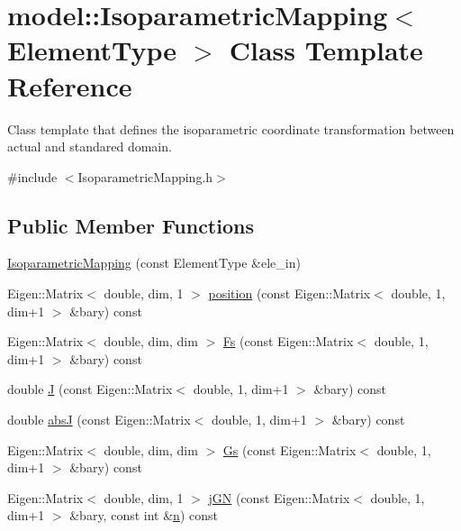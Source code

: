 \hypertarget{classmodel_1_1_isoparametric_mapping}{}\section{model\+:\+:Isoparametric\+Mapping$<$ Element\+Type $>$ Class Template Reference}
\label{classmodel_1_1_isoparametric_mapping}


Class template that defines the isoparametric coordinate transformation between actual and standared domain.  




{\ttfamily \#include $<$Isoparametric\+Mapping.\+h$>$}

\subsection*{Public Member Functions}
\begin{DoxyCompactItemize}
\item 
\hyperlink{classmodel_1_1_isoparametric_mapping_aa00eda6fb2ac62feab0304d6db3b9f85}{Isoparametric\+Mapping} (const Element\+Type \&ele\+\_\+in)
\item 
Eigen\+::\+Matrix$<$ double, dim, 1 $>$ \hyperlink{classmodel_1_1_isoparametric_mapping_afc694265c0b3e3e5ea515546f6ba3deb}{position} (const Eigen\+::\+Matrix$<$ double, 1, dim+1 $>$ \&bary) const 
\item 
Eigen\+::\+Matrix$<$ double, dim, dim $>$ \hyperlink{classmodel_1_1_isoparametric_mapping_a90cd80e33df4e67e2c7e64ea57aff892}{Fs} (const Eigen\+::\+Matrix$<$ double, 1, dim+1 $>$ \&bary) const 
\item 
double \hyperlink{classmodel_1_1_isoparametric_mapping_a07d209233c09c24be7e8eab338991e49}{J} (const Eigen\+::\+Matrix$<$ double, 1, dim+1 $>$ \&bary) const 
\item 
double \hyperlink{classmodel_1_1_isoparametric_mapping_ab99107544eab0fdbb5c825732c79a8ea}{abs\+J} (const Eigen\+::\+Matrix$<$ double, 1, dim+1 $>$ \&bary) const 
\item 
Eigen\+::\+Matrix$<$ double, dim, dim $>$ \hyperlink{classmodel_1_1_isoparametric_mapping_a80cebaf685e586bb4b84e66f995a1bfa}{Gs} (const Eigen\+::\+Matrix$<$ double, 1, dim+1 $>$ \&bary) const 
\item 
Eigen\+::\+Matrix$<$ double, dim, 1 $>$ \hyperlink{classmodel_1_1_isoparametric_mapping_a5f78e7154df74980a27f7d137a74fd24}{j\+G\+N} (const Eigen\+::\+Matrix$<$ double, 1, dim+1 $>$ \&bary, const int \&\hyperlink{_f_e_m_2linear__elasticity__3d_2tetgen_2generate_p_o_l_ycube_8m_a74637fc31d6aedd6d61cdc0c8154bc13}{n}) const 
\end{DoxyCompactItemize}



